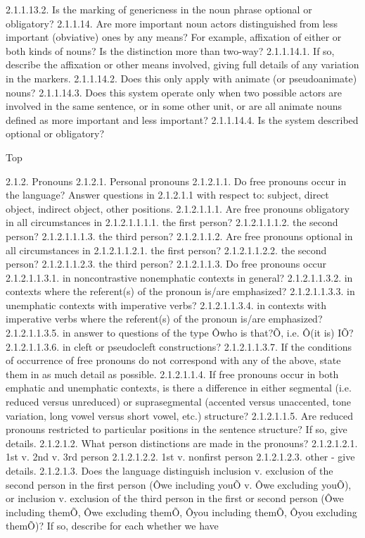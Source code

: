 2.1.1.13.2. Is the marking of genericness in the noun phrase optional or obligatory?
2.1.1.14. Are more important noun actors distinguished from less important (obviative) ones by any means? For example, affixation of either or both kinds of nouns? Is the distinction more than two-way?
2.1.1.14.1. If so, describe the affixation or other means involved, giving full details of any variation in the markers.
2.1.1.14.2. Does this only apply with animate (or pseudoanimate) nouns?
2.1.1.14.3. Does this system operate only when two possible actors are involved in the same sentence, or in some other unit, or are all animate nouns defined as more important and less important?
2.1.1.14.4. Is the system described optional or obligatory?



Top

2.1.2. Pronouns
2.1.2.1. Personal pronouns
2.1.2.1.1. Do free pronouns occur in the language? Answer questions in 2.1.2.1.1 with respect to: subject, direct object, indirect object, other positions.
2.1.2.1.1.1. Are free pronouns obligatory in all circumstances in
2.1.2.1.1.1.1. the first person?
2.1.2.1.1.1.2. the second person?
2.1.2.1.1.1.3. the third person?
2.1.2.1.1.2. Are free pronouns optional in all circumstances in
2.1.2.1.1.2.1. the first person?
2.1.2.1.1.2.2. the second person?
2.1.2.1.1.2.3. the third person?
2.1.2.1.1.3. Do free pronouns occur
2.1.2.1.1.3.1. in noncontrastive nonemphatic contexts in general?
2.1.2.1.1.3.2. in contexts where the referent(s) of the pronoun is/are emphasized?
2.1.2.1.1.3.3. in unemphatic contexts with imperative verbs?
2.1.2.1.1.3.4. in contexts with imperative verbs where the referent(s) of the pronoun is/are emphasized?
2.1.2.1.1.3.5. in answer to questions of the type Ôwho is that?Õ, i.e. Ô(it is) IÕ?
2.1.2.1.1.3.6. in cleft or pseudocleft constructions?
2.1.2.1.1.3.7. If the conditions of occurrence of free pronouns do not correspond with any of the above, state them in as much detail as possible.
2.1.2.1.1.4. If free pronouns occur in both emphatic and unemphatic contexts, is there a difference in either segmental (i.e. reduced versus unreduced) or suprasegmental (accented versus unaccented, tone variation, long vowel versus short vowel, etc.) structure?
2.1.2.1.1.5. Are reduced pronouns restricted to particular positions in the sentence structure? If so, give details.
2.1.2.1.2. What person distinctions are made in the pronouns?
2.1.2.1.2.1. 1st v. 2nd v. 3rd person
2.1.2.1.2.2. 1st v. nonfirst person
2.1.2.1.2.3. other - give details.
2.1.2.1.3. Does the language distinguish inclusion v. exclusion of the second person in the first person (Ôwe including youÕ v. Ôwe excluding youÕ), or inclusion v. exclusion of the third person in the first or second person (Ôwe including themÕ, Ôwe excluding themÕ, Ôyou including themÕ, Ôyou excluding themÕ)? If so, describe for each whether we have
